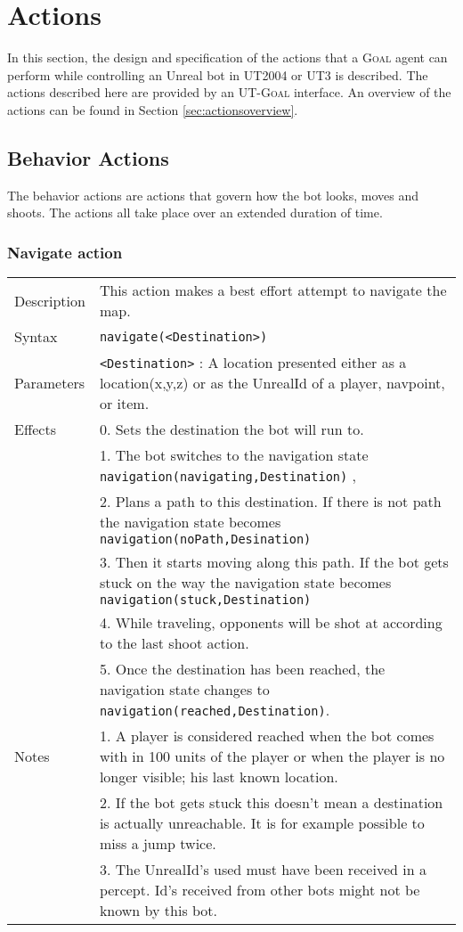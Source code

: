\documentclass[11pt,a4paper]{article}
\newcommand{\Goal}{\textsc{Goal}}
\begin{document}
\section{Actions}
\label{sec:actions}
In this section, the design and specification of the actions that a {\Goal} agent can perform while controlling an Unreal bot in UT2004 or UT3 is described. The actions described here are provided by an UT-{\Goal} interface. An overview of the actions can be found in Section \ref{sec:actionsoverview}.

\subsection{Behavior Actions}
The behavior actions are actions that govern how the bot looks, moves and shoots. The actions all take place over an extended duration of time.

\subsubsection*{Navigate action}

\begin{small}
\begin{tabular}{p{2cm}p{9cm}}
Description & This action makes a best effort attempt to navigate the map. \\
Syntax & \verb|navigate(<Destination>)|\\
Parameters & \verb|<Destination>| : A location presented either as a location(x,y,z) or as the UnrealId of a player, navpoint, or item. \\
Effects &	0. Sets the destination the bot will run to.\\
	 & 	1. The bot switches to the navigation state  \verb|navigation(navigating,Destination)| ,\\ 
	&	2. Plans a path to this destination. If there is not path the navigation state becomes \verb|navigation(noPath,Desination)|\\
	&	3. Then it starts moving along this path. If the bot gets stuck on the way the navigation state becomes \verb|navigation(stuck,Destination)| \\
	&	4. While traveling, opponents will be shot at according to the last shoot action.\\
	&	5. Once the destination has been reached, the navigation state changes to \verb|navigation(reached,Destination)|.\\
Notes & 	1. A player is considered reached when the bot comes with in 100 units of the player or when the player is no longer visible; his last known location.  \\
	&	2. If the bot gets stuck this doesn't mean a destination is actually unreachable. It is for example possible to miss a jump twice.\\
	& 	3. The UnrealId's used must have been received in a percept. Id's received from other bots might not be known by this bot. \\

\end{tabular}
\end{small}
\end{document}
